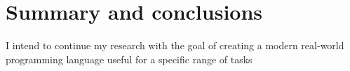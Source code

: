 \chapter{Summary and conclusions}\label{chap:summary}
I intend to continue my research with the goal of creating a modern real-world
programming language useful for a specific range of tasks
